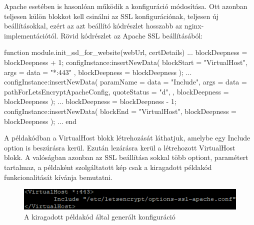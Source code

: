 Apache esetében is hasonlóan működik a konfiguráció módosítása. Ott azonban teljesen külön blokkot kell csinálni az SSL konfigurációnak, teljesen új beállításokkal, ezért az azt beállító kódrészlet hosszabb az nginx-implementációtól. Rövid kódrészlet az Apache SSL beállításából:
\begin{lua}
function module.init_ssl_for_website(webUrl, certDetails)
...
	blockDeepness = blockDeepness + 1;
	configInstance:insertNewData({
		blockStart = "VirtualHost",
		args = {
			{data = "*:443"}
		},
		blockDeepness = blockDeepness
	});
	...
	configInstance:insertNewData({
		paramName = {data = "Include"},
		args = {
			{data = pathForLetsEncryptApacheConfig, quoteStatus = "d"},
		},
		blockDeepness = blockDeepness
	});
	...
	blockDeepness = blockDeepness - 1;
	configInstance:insertNewData({
		blockEnd = "VirtualHost",
		blockDeepness = blockDeepness
	});
...
end
\end{lua}

\pagebreak

A példakódban a VirtualHost blokk létrehozását láthatjuk, amelybe egy Include option is beszúrásra kerül. Ezután lezárásra kerül a létrehozott VirtualHost blokk. A valóságban azonban az SSL beállítása sokkal több optiont, paramétert tartalmaz, a példaként szolgáltatott kép csak a kiragadott példakód funkcionalitását kívánja bemutatni.
\begin{figure}[t]
\centering
\includegraphics[scale=1.0]{images/apache_config_edit_example.png}
\caption{A kiragadott példakód által generált konfiguráció}
\end{figure}


